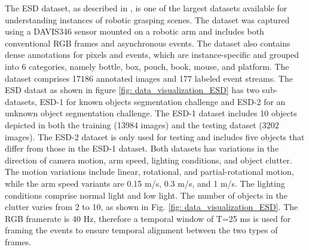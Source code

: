 \documentclass[lettersize,journal]{IEEEtran}
\begin{document}
The ESD dataset, as described in \cite{Huang2023AEnvironment}, is one of the largest datasets available for understanding instances of robotic grasping scenes. The dataset was captured using a DAVIS346 sensor mounted on a robotic arm and includes both conventional RGB frames and asynchronous events. The dataset also contains dense annotations for pixels and events, which are instance-specific and grouped into 6 categories, namely bottle, box, pouch, book, mouse, and platform. The dataset comprises 17186 annotated images and 177 labeled event streams. The ESD datast as shown in figure \ref{fig: data_visualization_ESD} has two sub-datasets, ESD-1 for known objects segmentation challenge and ESD-2 for an unknown object segmentation challenge. The ESD-1 dataset includes 10 objects depicted in both the training (13984 images) and the testing dataset (3202 images).  The ESD-2 dataset is only used for testing and includes five objects that differ from those in the ESD-1 dataset. Both datasets has variations in the direction of camera motion, arm speed, lighting conditions, and object clutter. The motion variations include linear, rotational, and partial-rotational motion, while the arm speed variants are 0.15 m/s, 0.3 m/s, and 1 m/s. The lighting conditions comprise normal light and low light. The number of objects in the clutter varies from 2 to 10, as shown in Fig. \ref{fig: data_visualization_ESD}. The RGB framerate is 40 Hz, therefore a temporal window of T=25 ms is used for framing the events to ensure temporal alignment between the two types of frames. 
\end{document}
